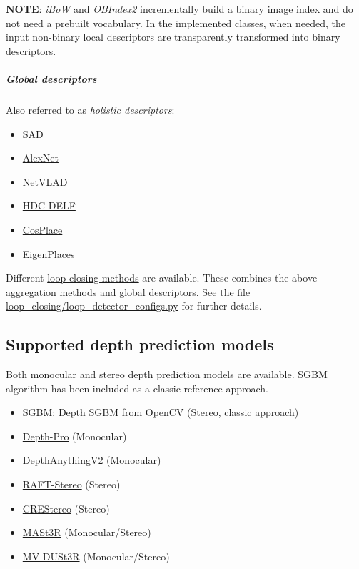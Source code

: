 \documentclass{article}
\providecommand{\tightlist}{%
  \setlength{\itemsep}{0pt}\setlength{\parskip}{0pt}}
\let\oldsubparagraph\subparagraph
\renewcommand{\subparagraph}[1]{\oldsubparagraph{#1}\mbox{}}
\begin{document}
\textbf{NOTE}: \emph{iBoW} and \emph{OBIndex2} incrementally build a
binary image index and do not need a prebuilt vocabulary. In the
implemented classes, when needed, the input non-binary local descriptors
are transparently transformed into binary descriptors.

\hypertarget{global-descriptors}{%
\subparagraph{Global descriptors}\label{global-descriptors}}

Also referred to as \emph{holistic descriptors}:

\begin{itemize}
\tightlist
\item
  \href{https://ieeexplore.ieee.org/document/6224623}{SAD}
\item
  \href{https://github.com/BVLC/caffe/tree/master/models/bvlc_alexnet}{AlexNet}
\item
  \href{https://www.di.ens.fr/willow/research/netvlad/}{NetVLAD} \cite{arandjelovic2016netvlad}
\item
  \href{https://www.tu-chemnitz.de/etit/proaut/hdc_desc}{HDC-DELF}
\item
  \href{https://github.com/gmberton/CosPlace}{CosPlace} \cite{berton2023cosplace}
\item
  \href{https://github.com/gmberton/EigenPlaces}{EigenPlaces} \cite{berton2023eigenplaces}
\end{itemize}

Different \protect\hyperlink{loop-closing}{loop closing methods} are
available. These combines the above aggregation methods and global
descriptors. See the file \url{loop_closing/loop_detector_configs.py}
for further details.

\hypertarget{supported-depth-prediction-models}{%
\subsection{Supported depth prediction
models}\label{supported-depth-prediction-models}}

Both monocular and stereo depth prediction models are available. SGBM
algorithm has been included as a classic reference approach.

\begin{itemize}
\tightlist
\item
  \href{https://ieeexplore.ieee.org/document/4359315}{SGBM}: Depth SGBM
  from OpenCV (Stereo, classic approach) \cite{hirschmuller2007stereo}
\item
  \href{https://arxiv.org/abs/2410.02073}{Depth-Pro} (Monocular) \cite{depthpro2023}
\item
  \href{https://arxiv.org/abs/2406.09414}{DepthAnythingV2} (Monocular) \cite{depthanythingv2_2024}
\item
  \href{https://arxiv.org/abs/2109.07547}{RAFT-Stereo} (Stereo) \cite{teed2021raft}
\item
  \href{https://arxiv.org/abs/2203.11483}{CREStereo} (Stereo) \cite{li2022cres}
\item
  \href{https://arxiv.org/abs/2406.09756}{MASt3R} (Monocular/Stereo) \cite{master}
\item
  \href{https://arxiv.org/abs/2412.06974}{MV-DUSt3R} (Monocular/Stereo) \cite{mvduster}    
\end{itemize}
\end{document}
